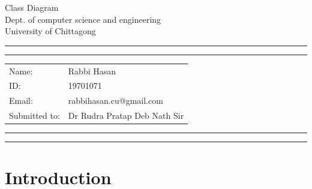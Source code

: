 \documentclass[10pt]{article}
\makeatletter
\newcommand{\studentname}{Rabbi Hasan}
\newcommand{\studentnumber}{19701071}
\newcommand{\projecttitle}{rabbihasan.cu@gmail.com}
\newcommand{\supervisor}{Dr Rudra Pratap Deb Nath Sir}
\makeatother
\begin{document}
\begin{center}
{\Huge{Class Diagram}} \\
\vspace{2mm}
{\Large{Dept. of computer science and engineering}} \\
\vspace{1mm}
{\Large{University of Chittagong}}
\end{center}

\vspace{5mm}
\hrule
\vspace{1mm}
\hrule

\vspace{3mm}
\begin{tabular}{ll} 
Name:           	        & {\studentname}   \\ 
ID: 	        & {\studentnumber} \\ 
Email: 	& {\projecttitle}  \\ 
Submitted to: 	    & {\supervisor}  \\ 
\end{tabular}

\vspace{3mm}
\hrule
\vspace{1mm}
\hrule

\section{Introduction}
 
\end{document}
